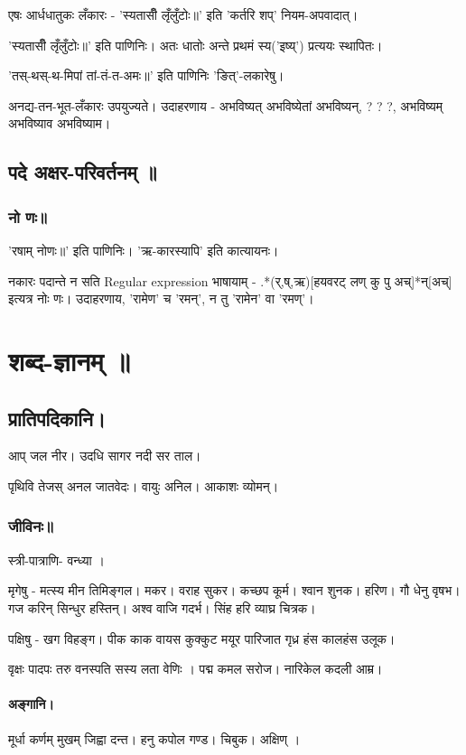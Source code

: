 \documentclass[oneside, article]{memoir}
\begin{document}
एषः आर्धधातुकः लँकारः - 'स्यतासीँ लृँलुँटोः॥' इति 'कर्तरि शप्‌' नियम-अपवादात्।

'स्यतासीँ लृँलुँटोः॥' इति पाणिनिः। अतः‌ धातोः अन्ते प्रथमं स्य('इष्य्') प्रत्ययः स्थापितः। 

'तस्-थस्-थ-मिपां तां-तं-त-अमः॥' इति पाणिनिः 'ङित्'-लकारेषु। 


अनद्य-तन-भूत-लँकारः उपयुज्यते। उदाहरणाय - अभविष्यत् अभविष्येतां अभविष्यन्, ? ? ?, अभविष्यम् अभविष्याव अभविष्याम।


\chapter{पदे अक्षर-परिवर्तनम् ॥}
\section{नो णः॥}
'रषाम् नोणः॥' इति पाणिनिः। 'ऋ-कारस्यापि' इति कात्यायनः।

नकारः पदान्ते न सति Regular expression भाषायाम् - .*(र्,ष्,ऋ)[हयवरट् लण् कु पु अच्]*न्[अच्] इत्यत्र नोः णः। उदाहरणाय, 'रामेण' च 'रमन्', न तु 'रामेन' वा 'रमण्'।

\part{शब्द-ज्ञानम् ॥}
\chapter{प्रातिपदिकानि।}
आप् जल नीर। उदधि सागर नदी सर ताल।

पृथिवि तेजस् अनल जातवेदः। वायुः अनिल। आकाशः व्योमन्।

\section{जीविनः॥}
स्त्री-पात्राणि- वन्ध्या ।

मृगेषु - मत्स्य मीन तिमिङ्गल। मकर। वराह सुकर। कच्छप कूर्म। श्वान शुनक। हरिण। गौ धेनु वृषभ। गज करिन् सिन्धुर हस्तिन्। अश्व वाजि गदर्भ। सिंह हरि व्याघ्र चित्रक।

पक्षिषु - खग विहङ्ग। पीक काक वायस कुक्कुट मयूर पारिजात गृध्र हंस कालहंस उलूक।

वृक्षः पादपः तरु वनस्पति सस्य लता वेणिः । पद्म कमल सरोज। नारिकेल कदली आम्र।


\subsection{अङ्गानि।}
मूर्धा कर्णम् मुखम् जिह्वा दन्त। हनु कपोल गण्ड। चिबुक। अक्षिण् ।
\end{document}
